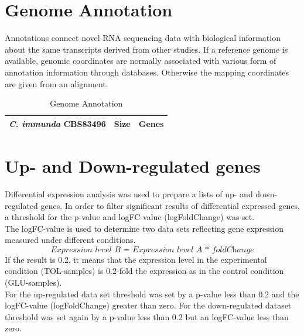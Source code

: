 \documentclass[12pt, a4paper]{report}
\begin{document}
\section{Genome Annotation}
Annotations connect novel RNA sequencing data with biological information about the same transcripts derived from other studies. If a reference genome is available, genomic coordinates are normally associated with various form of annotation information through databases. Otherwise the mapping coordinates are given from an alignment. 
\begin{table}[H]
	\centering
\begin{tabular}{c|c|c}
	\hline
	\textbf{\textit{C. immunda} CBS83496} & \textbf{Size} & \textbf{Genes} \\
	\hline
\end{tabular}
\caption{Genome Annotation}
\end{table}

\section{Up- and Down-regulated genes}
Differential expression analysis was used to prepare a lists of up- and down-regulated genes. In order to filter significant results of differential expressed genes, a threshold for the p-value and logFC-value (logFoldChange) was set. \\
The logFC-value is used to determine two data sets reflecting gene expression measured under different conditions. 
\[
\textit{Expression level B = Expression level A * foldChange}
\]
If the result is 0.2, it means that the expression level in the experimental condition (TOL-samples) is 0.2-fold the expression as in the control condition (GLU-samples). \\
For the up-regulated data set threshold was set by a p-value less than 0.2 and the logFC-value (logFoldChange) greater than zero. For the down-regulated dataset threshold was set again by a p-value less than 0.2 but an logFC-value less than zero. \\
\end{document}
